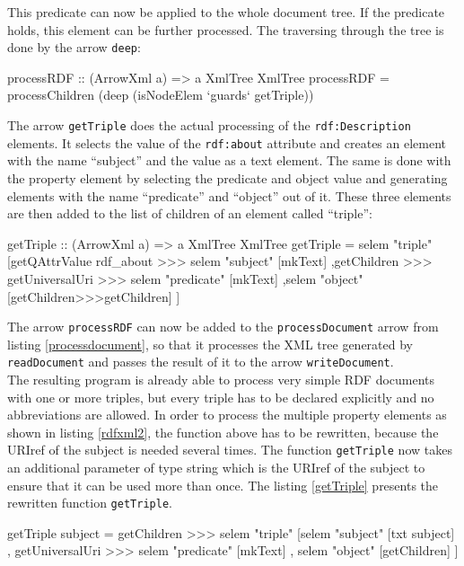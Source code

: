 \documentclass[11pt,a4paper,headsepline, bibtotoc]{scrreprt}
\begin{document}
This predicate can now be applied to the whole document tree. If the predicate holds, this element can be further processed. The traversing through the tree is done by the arrow \texttt{deep}: 
\begin{code}[caption={Apply the Predicate to the Tree}] 
processRDF :: (ArrowXml a) => a XmlTree XmlTree
processRDF 
  =  processChildren (deep (isNodeElem `guards` getTriple))
\end{code}
The arrow \texttt{getTriple} does the actual processing of the \texttt{rdf:Description} elements. It selects the value of the \texttt{rdf:about} attribute and creates an element with the name ``subject'' and the value as a text element. The same is done with the property element by selecting the predicate and object value and generating elements with the name ``predicate'' and ``object'' out of it. These three elements are then added to the list of children of an element called ``triple'':
\begin{code}[caption={getTriple}]
getTriple :: (ArrowXml a) => a XmlTree XmlTree
getTriple 
  = selem "triple"
    [getQAttrValue rdf_about >>> selem "subject" [mkText]
    ,getChildren >>> getUniversalUri 
                 >>> selem "predicate" [mkText]
    ,selem "object" [getChildren>>>getChildren]
    ]
\end{code} 
The arrow \texttt{processRDF} can now be added to the \texttt{processDocument} arrow from listing \ref{processdocument}, so that it processes the XML tree generated by \texttt{readDocument} and passes the result of it to the arrow \texttt{writeDocument}.\\
The resulting program is already able to process very simple RDF documents with one or more triples, but every triple has to be declared explicitly and no abbreviations are allowed. In order to process the multiple property elements as shown in listing \ref{rdfxml2}, the function above has to be rewritten, because the URIref of the subject is needed several times. The function \texttt{getTriple} now takes an additional parameter of type string which is the URIref of the subject to ensure that it can be used more than once. The listing \ref{getTriple} presents the rewritten function \texttt{getTriple}.
\begin{code}[caption={getTriple for Multiple Properties},label=getTriple]
getTriple subject
  = getChildren >>> selem "triple"
    [selem "subject" [txt subject]
    , getUniversalUri >>> selem "predicate" [mkText]
    , selem "object" [getChildren]
    ]
\end{code}
\end{document}
